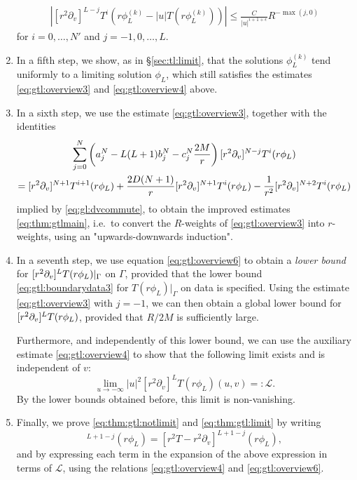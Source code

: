 \documentclass[11pt,english]{article}
\numberwithin{equation}{section}
\theoremstyle{remark}
\theoremstyle{plain}
\theoremstyle{remark}
\newcommand{\pu}{\partial_u}
\newcommand{\pv}{\partial_v}
\renewcommand{\(}{\left(}
\renewcommand{\)}{\right)}
\begin{document}
\begin{enumerate}
\begin{align}\label{eq:gtl:overview4}
\left|[r^2\pv]^{L-j}T^i\left(r\phi^{(k)}_L-|u|T(r\phi^{(k)}_L)\right)\right|\leq \frac{C}{|u|^{i+1+\epsilon}}R^{-\max(j,0)}
\end{align}
for $i=0,\dots,N'$ and $j=-1,0, \dots, L$. 
\item 
In a fifth step, we show, as in \S \ref{sec:tl:limit}, that the solutions $\phi_L^{(k)}$  tend uniformly to a limiting solution $\phi_L$, which still satisfies the estimates \eqref{eq:gtl:overview3} and \eqref{eq:gtl:overview4} above.
\item
In a sixth step, we use the estimate \eqref{eq:gtl:overview3}, together with the identities
\begin{multline}\label{eq:gtl:overview6}
\sum_{j=0}^N\left(a_j^N-L(L+1)b_j^N-c_j^N\frac{2M}{r}\right)\pvx{N-j}T^i(r\phi_L)\\
=[r^2\pv]^{N+1} T^{i+1}(r\phi_L)
+\frac{2D(N+1)}{r}\pvx{N+1}T^i(r\phi_L)-\frac{1}{r^2}\pvx{N+2}T^i(r\phi_L)
\end{multline}
implied by \eqref{eq:gl:dvcommute}, to obtain the improved estimates \eqref{eq:thm:gtlmain}, i.e.\ to convert the $R$-weights of \eqref{eq:gtl:overview3} into $r$-weights, using an "upwards-downwards induction".
\item
In a seventh step, we use equation \eqref{eq:gtl:overview6} to obtain a \textit{lower bound} for $\pvx{L}T(r\phi_L)|_{\Gamma}$ on $\Gamma$, provided that the lower bound \eqref{eq:gtl:boundarydata3} for $T(r\phi_L)|_{\Gamma}$ on data is specified. Using the estimate \eqref{eq:gtl:overview3} with $j=-1$, we can then obtain a global lower bound for $\pvx{L}T(r\phi_L)$, provided that  $R/2M$ is sufficiently large. 

Furthermore, and independently of this lower bound, we can use the auxiliary estimate \eqref{eq:gtl:overview4} to show that the following limit exists and is independent of $v$:
\begin{equation}
\lim_{u\to-\infty}|u|^2[r^2\pv]^LT(r\phi_L)(u,v)=:\mathcal{L}.
\end{equation}
By the lower bounds obtained before, this limit is non-vanishing.
\item
Finally, we prove \eqref{eq:thm:gtl:notlimit} and \eqref{eq:thm:gtl:limit} by writing
\begin{equation}
[r^2\pu]^{L+1-j}(r\phi_L)=[r^2T-r^2\pv]^{L+1-j}(r\phi_L),
\end{equation}
and by expressing each term in the expansion of the above expression in terms of $\mathcal{L}$, using the relations \eqref{eq:gtl:overview4} and \eqref{eq:gtl:overview6}.
\end{enumerate}
\end{document}
